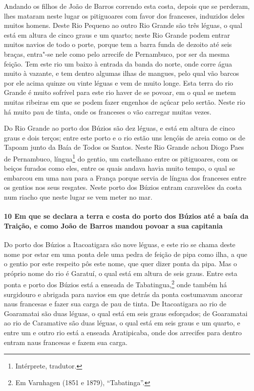 Andando os filhos de João de Barros correndo esta costa, depois que se perderam, lhes
mataram neste lugar os pitiguoares com favor dos franceses, induzidos deles muitos homens.
Deste Rio Pequeno ao outro Rio Grande são três léguas, o qual está em altura de cinco
graus e um quarto; neste Rio Grande podem entrar muitos navios de todo o porte, porque tem
a barra funda de dezoito até seis braças, entra"-se nele como pelo arrecife de Pernambuco,
por ser da mesma feição. Tem este rio um baixo à entrada da banda do norte, onde corre
água muito à vazante, e tem dentro algumas ilhas de mangues, pelo qual vão barcos por ele
acima quinze ou vinte léguas e vem de muito longe. Esta terra do rio Grande é muito
sofrível para este rio haver de se povoar, em o qual se metem muitas ribeiras em que se
podem fazer engenhos de açúcar pelo sertão. Neste rio há muito pau de tinta, onde os
franceses o vão carregar muitas vezes.

Do Rio Grande ao porto dos Búzios são dez léguas, e está em altura de cinco graus e dois
terços; entre este porto e o rio estão uns lençóis de areia como os de Tapoam junto da
Baía de Todos os Santos. Neste Rio Grande achou Diogo Paes de Pernambuco, língua\footnote{ 
Intérprete, tradutor.} do gentio, um castelhano entre os pitiguoares, com os beiços
furados como eles, entre os quais andava havia muito tempo, o qual se embarcou em uma nau
para a França porque servia de língua dos franceses entre os gentios nos seus resgates.
Neste porto dos Búzios entram caravelões da costa num riacho que neste lugar se vem meter
no mar.

\paragraph{10 Em que se declara a terra e costa do porto dos Búzios até a baía da Traição,
e como João de Barros mandou povoar a sua capitania}

Do porto dos Búzios a Itacoatigara são nove léguas, e este rio se chama deste nome por
estar em uma ponta dele uma pedra de feição de pipa como ilha, a que o gentio por este
respeito pôs este nome, que quer dizer ponta da pipa. Mas o próprio nome do rio é Garatuí,
o qual está em altura de seis graus. Entre esta ponta e porto dos Búzios está a enseada de
Tabatingua,\footnote{ Em Varnhagen (1851 e 1879), ``Tabatinga''.} onde também há
surgidouro e abrigada para navios em que detrás da ponta costumavam ancorar naus francesas
e fazer sua carga de pau de tinta. De Itacoatigara ao rio de Goaramatai são duas léguas, o
qual está em seis graus esforçados; de Goaramatai ao rio de Caramative são duas léguas, o
qual está em seis graus e um quarto, e entre um e outro rio está a enseada Aratipicaba,
onde dos arrecifes para dentro entram naus francesas e fazem sua carga.

